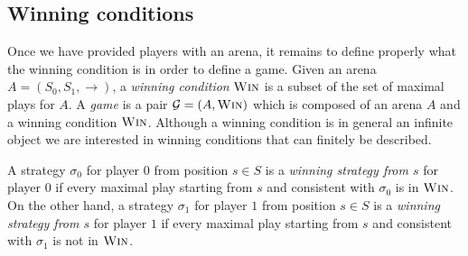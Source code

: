 



\subsection{Winning conditions}

\newcommand{\win}{\textsc{Win}}


Once we have provided players with an arena, it remains to define  properly what the winning condition is in order to define a game. Given an arena $A = (S_0, S_1, \rightarrow)$, a {\em winning condition}
$\win$
is a subset  
of the set of maximal plays for $A$. A {\em game} is a pair $\mathcal{G}= (A, \win)$ which is composed of an arena $A$ and a winning condition $\win$.
Although a winning condition is in general an infinite object we are interested in winning conditions 
that can finitely be described.

A strategy $\sigma_0$ for player $0$ from position $s \in S$ is a {\em winning strategy
 from $s$} for player $0$ if 
every maximal play starting from $s$ and consistent with $\sigma_0$ is in $\win$.
On the other hand, a strategy $\sigma_1$ for player $1$ from position $s \in S$ is a {\em winning strategy
 from $s$} for player $1$ if 
every maximal play starting from $s$ and consistent with $\sigma_1$ is not in $\win$.
 

